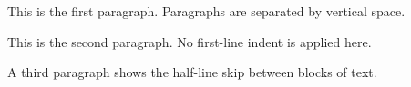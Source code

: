 \documentclass{article}
\begin{document}
This is the first paragraph. Paragraphs are separated by vertical space.

This is the second paragraph. No first-line indent is applied here.

A third paragraph shows the half-line skip between blocks of text.
\end{document}
